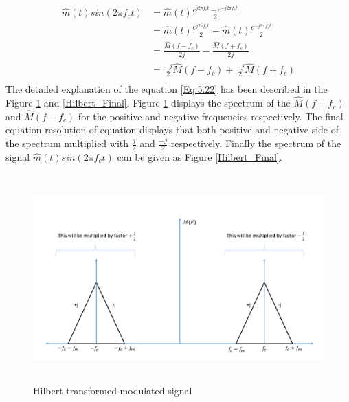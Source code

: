 \begin{equation}
\begin{split}
{\hat{m}(t)} sin(2\pi f_c t)&={\hat{m}(t)}\frac{e^{j2\pi f_c t} - e^{-j2\pi f_c t} }{2}\\
&={\hat{m}(t)}\frac{e^{j2\pi f_c t}}{2} - {\hat{m}(t)}\frac{e^{-j2\pi f_c t}}{2}\\
&={\frac{\hat{M}(f-f_c)}{2j}}-{\frac{\hat{M}(f+f_c)}{2j}}\\
&={\frac{-j}{2}\hat{M}(f-f_c)}+{\frac{-j}{2}\hat{M}(f+f_c)}\\
\end{split}
\label{5.22}
\end{equation}
The detailed explanation of the equation \ref{Eq:5.22} has been described in the Figure \ref{Hilbert_Transformed_modulated_signal} and \ref{Hilbert_Final}. Figure \ref{Hilbert_Transformed_modulated_signal} displays the spectrum of the $\hat{M}(f+f_c)$ and $\hat{M}(f-f_c)$ for the positive and negative frequencies respectively. The final equation resolution of equation displays that both positive and negative side of the spectrum multiplied with $\frac{j}{2}$ and $\frac{-j}{2}$ respectively. Finally the spectrum of the signal ${\hat{m}(t)} sin(2\pi f_c t)$ can be given as Figure \ref{Hilbert_Final}.
\begin{figure}[h]
	\centering
	\includegraphics[width=1.0\textwidth, height=8cm]{./sdf/simplified_coherent_receiver/figures/SSB4.pdf}
	\caption{Hilbert transformed modulated signal}\label{Hilbert_Transformed_modulated_signal}
\end{figure}


